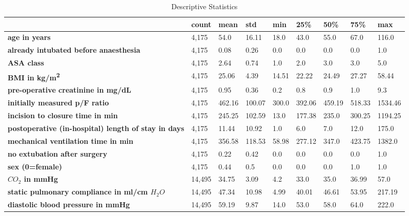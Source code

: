 \documentclass[referee,lineno,pdflatex,sn-nature]{sn-jnl}%
\theoremstyle{thmstyleone}%
\theoremstyle{thmstyletwo}%
\theoremstyle{thmstylethree}%
\begin{document}
\begin{appendices}
\begin{table}
    \centering
    \caption{Descriptive Statistics}%
    \begin{tabular}{@{} lllllllll @{}}
    \toprule
        & \textbf{count} & \textbf{mean} & \textbf{std} & \textbf{min} & \textbf{25\%} & \textbf{50\%} & \textbf{75\%} & \textbf{max} \\ 
    \midrule
        \textbf{\footnotemark[1]age in years} & 4,175 & 54.0 & 16.11 & 18.0 & 43.0 & 55.0 & 67.0 & 116.0 \\ 
        \textbf{\footnotemark[1]already intubated before anaesthesia} & 4,175 & 0.08 & 0.26 & 0.0 & 0.0 & 0.0 & 0.0 & 1.0 \\ 
        \textbf{\footnotemark[1]ASA class} & 4,175 & 2.64 & 0.74 & 1.0 & 2.0 & 3.0 & 3.0 & 5.0 \\ 
        \textbf{\footnotemark[1]BMI in kg/m\textsuperscript{2}} & 4,175 & 25.06 & 4.39 & 14.51 & 22.22 & 24.49 & 27.27 & 58.44 \\ 
        \textbf{\footnotemark[1]pre-operative creatinine in mg/dL} & 4,175 & 0.95 & 0.36 & 0.2 & 0.8 & 0.9 & 1.0 & 9.3 \\ 
        \textbf{\footnotemark[1]initially measured p/F ratio} & 4,175 & 462.16 & 100.07 & 300.0 & 392.06 & 459.19 & 518.33 & 1534.46 \\ 
        \textbf{\footnotemark[1]incision to closure time in min} & 4,175 & 245.25 & 102.59 & 13.0 & 177.38 & 235.0 & 300.25 & 1194.25 \\ 
        \textbf{\footnotemark[1]postoperative (in-hospital) length of stay in days} & 4,175 & 11.44 & 10.92 & 1.0 & 6.0 & 7.0 & 12.0 & 175.0 \\ 
        \textbf{\footnotemark[1]mechanical ventilation time in min} & 4,175 & 356.58 & 118.53 & 58.98 & 277.12 & 347.0 & 423.75 & 1382.0 \\ 
        \textbf{\footnotemark[1]no extubation after surgery} & 4,175 & 0.22 & 0.42 & 0.0 & 0.0 & 0.0 & 0.0 & 1.0 \\ 
        \textbf{\footnotemark[1]sex (0=female)} & 4,175 & 0.44 & 0.5 & 0.0 & 0.0 & 0.0 & 1.0 & 1.0 \\ 
        \textbf{\footnotemark[2]$CO_2$ in mmHg} & 14,495 & 34.75 & 3.09 & 4.2 & 33.0 & 35.0 & 36.99 & 57.0 \\ 
        \textbf{\footnotemark[2]static pulmonary compliance in ml/cm $H_2O$} & 14,495 & 47.34 & 10.98 & 4.99 & 40.01 & 46.61 & 53.95 & 217.19 \\ 
        \textbf{\footnotemark[2]diastolic blood pressure in mmHg} & 14,495 & 59.19 & 9.87 & 14.0 & 53.0 & 58.0 & 64.0 & 222.0 \\ 

\end{tabular}
\end{table}
\end{appendices}
\end{document}
